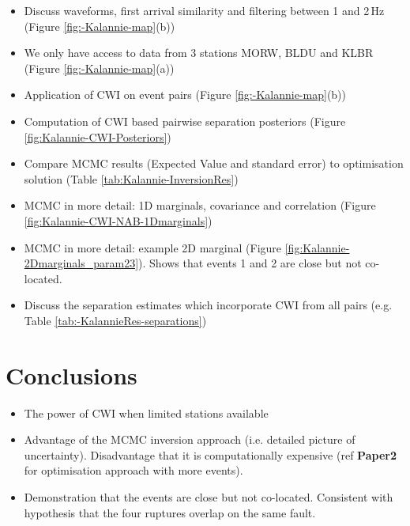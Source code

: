 \documentclass[grl]{agutex}
\begin{document}
\begin{article}
\begin{itemize}
\item Discuss waveforms, first arrival similarity and filtering between 1 and 2\,Hz (Figure \ref{fig:-Kalannie-map}(b))
\item We only have access to data from 3 stations MORW, BLDU and KLBR (Figure \ref{fig:-Kalannie-map}(a))
\item Application of CWI on event pairs (Figure \ref{fig:-Kalannie-map}(b))
\item Computation of CWI based pairwise separation posteriors (Figure \ref{fig:Kalannie-CWI-Posteriors})
\item Compare MCMC results (Expected Value and standard error) to optimisation solution (Table \ref{tab:Kalannie-InversionRes})
\item MCMC in more detail: 1D marginals, covariance and correlation (Figure \ref{fig:Kalannie-CWI-NAB-1Dmarginals})
\item MCMC in more detail: example 2D marginal (Figure \ref{fig:Kalannie-2Dmarginals_param23}).
Shows that events 1 and 2 are close but not co-located.
\item Discuss the separation estimates which incorporate CWI from all pairs (e.g. Table \ref{tab:-KalannieRes-separations})
\end{itemize}

\section{Conclusions}
\begin{itemize}
\item The power of CWI when limited stations available
\item Advantage of the MCMC inversion approach (i.e. detailed picture of uncertainty). Disadvantage that it
is computationally expensive (ref \textbf{Paper2} for optimisation approach with more events).
\item Demonstration that the events are close but not co-located. Consistent with hypothesis that the
four ruptures overlap on the same fault.
\end{itemize}






\end{article}
\end{document}
